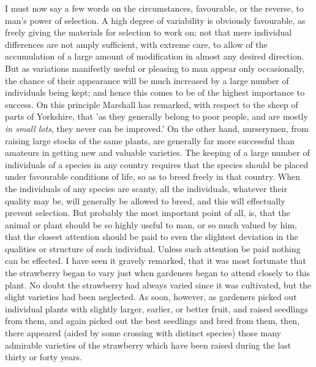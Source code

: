\indent I must now say a few words on the circumstances, favourable, or the reverse, to man's power of selection. A high degree of variability is obviously favourable, as freely giving the materials for selection to work on; not that mere individual differences are not amply sufficient, with extreme care, to allow of the accumulation of a large amount of modification in almost any desired direction. But as variations manifestly useful or pleasing to man appear only occasionally, the chance of their appearance will be much increased by a large number of individuals being kept; and hence this comes to be of the highest importance to success. On this principle Marshall has remarked, with respect to the sheep of parts of Yorkshire, that 'as they generally belong to poor people, and are mostly \emph{in small lots}, they never can be improved.' On the other hand, nurserymen, from raising large stocks of the same plants, are generally far more successful than amateurs in getting new and valuable varieties. The keeping of a large number of individuals of a species in any country requires that the species should be placed under favourable conditions of life, so as to breed freely in that country. When the individuals of any species are scanty, all the individuals, whatever their quality may be, will generally be allowed to breed, and this will effectually prevent selection. But probably the most important point of all, is, that the animal or plant should be so highly useful to man, or so much valued by him, that the closest attention should be paid to even the slightest deviation in the qualities or structure of each individual. Unless such attention be paid nothing can be effected. I have seen it gravely remarked, that it was most fortunate that the strawberry began to vary just when gardeners began to attend closely to this plant.  No doubt the strawberry had always varied since it was cultivated, but the slight varieties had been neglected. As soon, however, as gardeners picked out individual plants with slightly larger, earlier, or better fruit, and raised seedlings from them, and again picked out the best seedlings and bred from them, then, there appeared (aided by some crossing with distinct species) those many admirable varieties of the strawberry which have been raised during the last thirty or forty years.  \\
